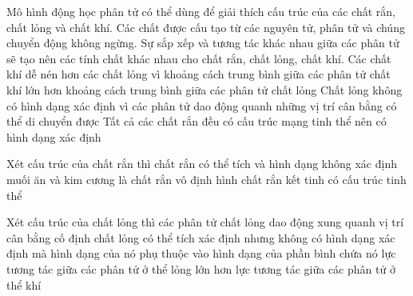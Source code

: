 \begin{ex}%
Mô hình động học phân tử có thể dùng để giải thích cấu trúc của các chất rắn, chất lỏng và chất khí. Các chất được cấu tạo từ các nguyên tử, phân tử và chúng chuyển động không ngừng. Sự sắp xếp và tương tác khác nhau giữa các phân tử sẽ tạo nên các tính chất khác nhau cho chất rắn, chất lỏng, chất khí.
{\True Các chất khí dễ nén hơn các chất lỏng vì khoảng cách trung bình giữa các phân tử chất khí lớn hơn khoảng cách trung bình giữa các phân tử chất lỏng}
{\True Chất lỏng không có hình dạng xác định vì các phân tử dao động quanh những vị trí cân bằng có thể di chuyển được}
{Tất cả các chất rắn đều có cấu trúc mạng tinh thể nên có hình dạng xác định}
\end{ex}


\begin{ex}%
Xét cấu trúc của chất rắn thì
{chất rắn có thể tích và hình dạng không xác định}
{muối ăn và kim cương là chất rắn vô định hình}
{chất rắn kết tinh có cấu trúc tinh thể}
\end{ex}

\begin{ex}%
Xét cấu trúc của chất lỏng thì
{các phân tử chất lỏng dao động xung quanh vị trí cân bằng cố định}
{\True chất lỏng có thể tích xác định nhưng không có hình dạng xác định mà hình dạng của nó phụ thuộc vào hình dạng của phần bình chứa nó}
{\True lực tương tác giữa các phân tử ở thể lỏng lớn hơn lực tương tác giữa các phân tử ở thể khí}
\end{ex}

